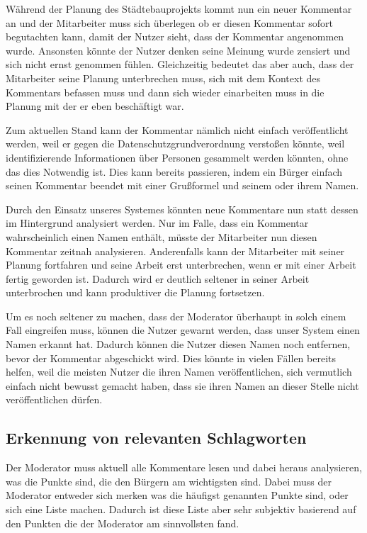 \documentclass[runningheads]{llncs}
\begin{document}
Während der Planung des Städtebauprojekts kommt nun ein neuer Kommentar an und der Mitarbeiter muss sich überlegen ob er diesen Kommentar sofort begutachten kann, damit der Nutzer sieht, dass der Kommentar angenommen wurde.
Ansonsten könnte der Nutzer denken seine Meinung wurde zensiert und sich nicht ernst genommen fühlen.
Gleichzeitig bedeutet das aber auch, dass der Mitarbeiter seine Planung unterbrechen muss, sich mit dem Kontext des Kommentars befassen muss und dann sich wieder einarbeiten muss in die Planung mit der er eben beschäftigt war.

Zum aktuellen Stand kann der Kommentar nämlich nicht einfach veröffentlicht werden, weil er gegen die Datenschutzgrundverordnung verstoßen könnte, weil identifizierende Informationen über Personen gesammelt werden könnten, ohne das dies Notwendig ist. 
Dies kann bereits passieren, indem ein Bürger einfach seinen Kommentar beendet mit einer Grußformel und seinem oder ihrem Namen.

Durch den Einsatz unseres Systemes könnten neue Kommentare nun statt dessen im Hintergrund analysiert werden.
Nur im Falle, dass ein Kommentar wahrscheinlich einen Namen enthält, müsste der Mitarbeiter nun diesen Kommentar zeitnah analysieren.
Anderenfalls kann der Mitarbeiter mit seiner Planung fortfahren und seine Arbeit erst unterbrechen, wenn er mit einer Arbeit fertig geworden ist.
Dadurch wird er deutlich seltener in seiner Arbeit unterbrochen und kann produktiver die Planung fortsetzen.

Um es noch seltener zu machen, dass der Moderator überhaupt in solch einem Fall eingreifen muss, können die Nutzer gewarnt werden, dass unser System einen Namen erkannt hat.
Dadurch können die Nutzer diesen Namen noch entfernen, bevor der Kommentar abgeschickt wird.
Dies könnte in vielen Fällen bereits helfen, weil die meisten Nutzer die ihren Namen veröffentlichen, sich vermutlich einfach nicht bewusst gemacht haben, dass sie ihren Namen an dieser Stelle nicht veröffentlichen dürfen.
\subsection{Erkennung von relevanten Schlagworten}
Der Moderator muss aktuell alle Kommentare lesen und dabei heraus analysieren, was die Punkte sind, die den Bürgern am wichtigsten sind.
Dabei muss der Moderator entweder sich merken was die häufigst genannten Punkte sind, oder sich eine Liste machen.
Dadurch ist diese Liste aber sehr subjektiv basierend auf den Punkten die der Moderator am sinnvollsten fand.
\end{document}
